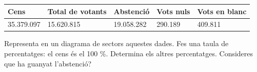\begin{mylist}
\begin{longtable}{|p{0.9in}|p{0.9in}|p{0.9in}|p{0.9in}|p{0.9in}|} \hline 
Cens & Total de votants & Abstenció & Vots nuls & Vots en blanc \\ \hline 
35.379.097 & 15.620.815 & 19.058.282 & 290.189 & 409.811 \\ \hline 
\end{longtable}

Representa en un diagrama de sectors aquestes dades. Fes una taula de percentatges: el cens és el 100 \%. Determina els altres percentatges. Consideres que ha guanyat l'abstenció?

   

\end{mylist} 

